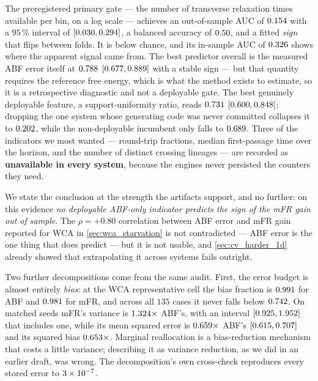 The preregistered primary gate --- the number of transverse relaxation times available per bin,
on a log scale --- achieves an out-of-sample AUC of $0.154$ with a $95\,\%$ interval of
$[0.030, 0.294]$, a balanced accuracy of $0.50$, and a fitted \emph{sign}
that flips between folds. It is below chance, and its in-sample AUC of $0.326$ shows
where the apparent signal came from. The best predictor overall is the measured ABF error itself
at $0.788$ $[0.677, 0.889]$ with a stable sign --- but that quantity requires the
reference free energy, which is what the method exists to estimate, so it is a retrospective
diagnostic and not a deployable gate. The best genuinely deployable feature, a support-uniformity
ratio, reads $0.731$ $[0.600, 0.848]$; dropping the one system whose
generating code was never committed collapses it to $0.202$, while the
non-deployable incumbent only falls to $0.689$. Three of the indicators we most wanted
--- round-trip fractions, median first-passage time over the horizon, and the number of distinct
crossing lineages --- are recorded as \textbf{unavailable in every system}, because the engines
never persisted the counters they need.

We state the conclusion at the strength the artifacts support, and no further: on this evidence
\emph{no deployable ABF-only indicator predicts the sign of the mFR gain out of sample}. The
$\rho = +0.80$ correlation between ABF error and mFR gain reported for WCA in
\cref{sec:wca_starvation} is not contradicted --- ABF error is the one thing that does predict ---
but it is not usable, and \cref{sec:cv_harder_1d} already showed that extrapolating it across systems
fails outright.

Two further decompositions come from the same audit. First, the error budget is almost entirely
\emph{bias}: at the WCA representative cell the bias fraction is $0.991$ for ABF and
$0.981$ for mFR, and across all $135$ cases it never falls below $0.742$. On
matched seeds mFR's variance is $1.324\times$ ABF's, with an interval
$[0.925, 1.952]$ that includes one, while its mean squared error is
$0.659\times$ ABF's $[0.615, 0.707]$ and its squared bias
$0.653\times$. Marginal reallocation is a bias-reduction mechanism that costs a little
variance; describing it as variance reduction, as we did in an earlier draft, was wrong. The
decomposition's own cross-check reproduces every stored error to $3\times10^{-7}$.

